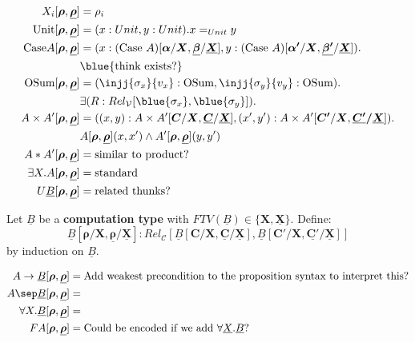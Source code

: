 \documentclass{article}
\begin{document}
\begin{align*}
    X_i[\bm{\rho},\bm{\underline{\rho}}] &= \rho_i\\
    \textrm{Unit} [\bm{\rho},\bm{\underline{\rho}}]&= (x : Unit , y : Unit). x =_{Unit} y\\
    \textrm{Case} A [\bm{\rho},\bm{\underline{\rho}}]&= (x : (\textrm{Case } A)[\bm{\alpha}/\bm{X},\bm{\underline{\beta}}/\bm{\underline{X}}],
    y : (\textrm{Case } A)[\bm{\alpha'}/\bm{X},\bm{\underline{\beta'}}/\bm{\underline{X}}]). 
    \\
    & \blue{\textrm{think exists?}}\\
    \textrm{OSum} [\bm{\rho},\bm{\underline{\rho}}]&= (\injj{\sigma_x}{v_x} : \textrm{OSum} , \injj{\sigma_y}{v_y} : \textrm{OSum}). \\
    & \exists (R : Rel_{\mathcal{V}}[\blue{\sigma_x},\blue{\sigma_y}]).\\
    A \times A' [\bm{\rho},\bm{\underline{\rho}}]&= ((x,y) : A\times A'[\bm{C}/\bm{X},\bm{\underline{C}}/\bm{\underline{X}}], (x',y') :  A \times A'[\bm{C'}/\bm{X},\bm{\underline{C'}/\bm{\underline{X}}}]).\\
    & A[\bm{\rho},\bm{\underline{\rho}}](x,x')\land A'[\bm{\rho},\bm{\underline{\rho}}](y,y') \\
    A * A' [\bm{\rho},\bm{\underline{\rho}}]&= \textrm{similar to product?}\\
    \exists X . A [\bm{\rho},\bm{\underline{\rho}}]&= \textrm{standard} \\
    U \underline{B} [\bm{\rho},\bm{\underline{\rho}}]&= \textrm{related thunks?}\\
\end{align*}

Let $\underline{B}$ be a \textbf{computation type} with $FTV(\underline{B}) \in \{\bm{X},\bm{\underline{X}}\}$. Define:
\[
  \underline{B}[\bm{\rho}/\bm{X},\bm{\underline{\rho}}/\bm{\underline{X}}] : Rel_{\mathcal{C}}[\underline{B}[\bm{C}/\bm{X},\bm{\underline{C}}/\bm{\underline{X}}], \underline{B}[\bm{C'}/\bm{X},\bm{\underline{C'}/\bm{\underline{X}}}]] 
\] 
by induction on $\underline{B}$. 

\begin{align*}
    A \rightarrow \underline{B}[\bm{\rho},\bm{\underline{\rho}}] &= \textrm{Add weakest precondition to the proposition syntax to interpret this?}\\
    A \sep \underline{B}[\bm{\rho},\bm{\underline{\rho}}] &= \\
    \forall X . \underline{B} [\bm{\rho},\bm{\underline{\rho}}]&= \\
    F A[\bm{\rho},\bm{\underline{\rho}}] &= \textrm{Could be encoded if we add } \forall \underline{X} . \underline{B}?\\
\end{align*}
\end{document}
